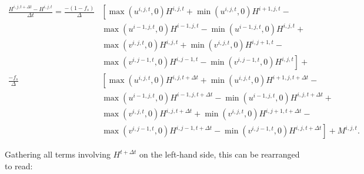 \documentclass{article}
\begin{document}
\begin{equation} \label{eq:thickness_07}
\begin{split}
\frac{H^{i,j,t+\Delta t} - H^{i,j,t}}{\Delta t} = \frac{-\left( 1 - f_s \right)}{\Delta} & \left[ 
\max \left( u^{i,j,t},0 \right) H^{i,j,t} + \min \left( u^{i,j,t},0 \right) H^{i+1,j,t} \right. - \\
& \left. \max \left( u^{i-1,j,t},0 \right) H^{i-1,j,t} - \min \left( u^{i-1,j,t},0 \right) H^{i,j,t} \right. + \\
& \left. \max \left( v^{i,j,t},0 \right) H^{i,j,t} + \min \left( v^{i,j,t},0 \right) H^{i,j+1,t} \right. - \\
& \left. \max \left( v^{i,j-1,t},0 \right) H^{i,j-1,t} - \min \left( v^{i,j-1,t},0 \right) H^{i,j,t} \right] + \\
\frac{-f_s}{\Delta} & \left[
\max \left( u^{i,j,t},0 \right) H^{i,j,t+\Delta t} + \min \left( u^{i,j,t},0 \right) H^{i+1,j,t+\Delta t} \right. - \\
& \left. \max \left( u^{i-1,j,t},0 \right) H^{i-1,j,t+\Delta t} - \min \left( u^{i-1,j,t},0 \right) H^{i,j,t+\Delta t} \right. + \\
& \left. \max \left( v^{i,j,t},0 \right) H^{i,j,t+\Delta t} + \min \left( v^{i,j,t},0 \right) H^{i,j+1,t+\Delta t} \right. - \\
& \left. \max \left( v^{i,j-1,t},0 \right) H^{i,j-1,t+\Delta t} - \min \left( v^{i,j-1,t},0 \right) H^{i,j,t+\Delta t} \right]
+ M^{i,j,t}.
\end{split}
\end{equation}

Gathering all terms involving $H^{t+\Delta t}$ on the left-hand side, this can be rearranged to read:
\end{document}
